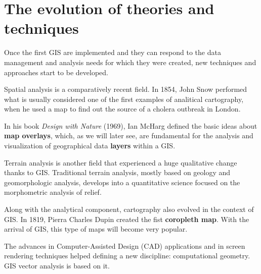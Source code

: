 \section{The evolution of theories and techniques}

Once the first GIS are implemented and they can respond to the data management and analysis needs for which they were created, new techniques and approaches start to be developed. 

Spatial analysis is a comparatively recent field. In 1854, John Snow performed what is usually considered one of the first examples of analitical cartography, when he used a map to find out the source of a cholera outbreak in London.

In his book \emph{Design with Nature} (1969), Ian McHarg defined the basic ideas about  \textbf{map overlays}, which, as we will later see, are fundamental for the analysis and visualization of geographical data \textbf{layers} within a GIS.

Terrain analysis is another field that experienced a huge qualitative change thanks to GIS. Traditional terrain analysis, mostly based on geology and geomorphologic analysis, develops into a quantitative science focused on the morphometric analysis of relief.

Along with the analytical component, cartography also evolved in the context of GIS. In 1819, Pierra Charles Dupin created the fist \textbf{coropleth map}. With the arrival of GIS, this type of maps will become very popular.

The advances in Computer-Assisted Design (CAD) applications and in screen rendering techniques helped defining a new discipline: computational geometry. GIS vector analysis is based on it.

\pagestyle{empty}
